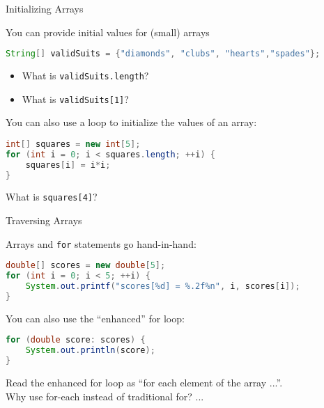 \documentclass{beamer}
\begin{document}
\begin{frame}[fragile]{Initializing Arrays}


You can provide initial values for (small) arrays
\begin{lstlisting}[language=Java]
String[] validSuits = {"diamonds", "clubs", "hearts","spades"};
\end{lstlisting}

\begin{itemize}
\item What is {\tt validSuits.length}?
\item What is {\tt validSuits[1]}?
\end{itemize}

You can also use a loop to initialize the values of an array:
\begin{lstlisting}[language=Java]
int[] squares = new int[5];
for (int i = 0; i < squares.length; ++i) {
    squares[i] = i*i;
}
\end{lstlisting}

What is {\tt squares[4]}?

\end{frame}

\begin{frame}[fragile]{Traversing Arrays}


Arrays and {\tt for} statements go hand-in-hand:
\begin{lstlisting}[language=Java]
double[] scores = new double[5];
for (int i = 0; i < 5; ++i) {
    System.out.printf("scores[%d] = %.2f%n", i, scores[i]);
}
\end{lstlisting}

You can also use the ``enhanced'' for loop:

\begin{lstlisting}[language=Java]
for (double score: scores) {
    System.out.println(score);
}
\end{lstlisting}

Read the enhanced for loop as ``for each element of the array ...''.\\
\vspace{.1in}
Why use for-each instead of traditional for? ...

\end{frame}
\end{document}
